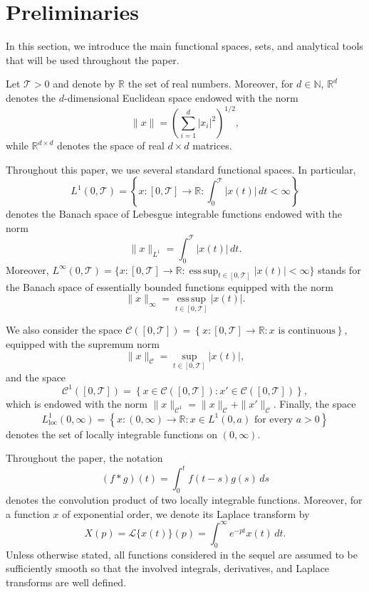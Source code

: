 \documentclass[11pt]{article}
\numberwithin{equation}{section}
\begin{document}
\section{Preliminaries}

In this section, we introduce the main functional spaces, sets, and analytical tools that will be used throughout the paper.

Let $\mathcal{\mathcal{T}} > 0$ and denote by $\mathbb{R}$ the set of real numbers. Moreover, for \(d\in\mathbb N\), \(\mathbb R^d\) denotes the \(d\)-dimensional Euclidean space endowed with the norm
\[
\|x\|
=
\left(
\sum_{i=1}^{d}|x_i|^2
\right)^{1/2},
\]
while \(\mathbb R^{d\times d}\) denotes the space of real \(d\times d\) matrices.


Throughout this paper, we use several standard functional spaces. In particular,
\[
L^{1}(0,\mathcal{\mathcal{T}})
=
\left\{
x:[0,\mathcal{\mathcal{T}}]\to\mathbb{R}:
\int_{0}^{\mathcal{\mathcal{T}}}|x(t)|\,dt<\infty
\right\}
\]
denotes the Banach space of Lebesgue integrable functions endowed with the norm
\[
\|x\|_{L^{1}}
=
\int_{0}^{\mathcal{\mathcal{T}}}|x(t)|\,dt.
\]
Moreover,
\(
L^{\infty}(0,\mathcal{\mathcal{T}})
=
\{
x:[0,\mathcal{\mathcal{T}}]\to\mathbb{R}:
\operatorname*{ess\,sup}_{t\in[0,\mathcal{\mathcal{T}}]}|x(t)|<\infty
\}
\)
stands for the Banach space of essentially bounded functions equipped with the norm
\[
\|x\|_{\infty}
=
\operatorname*{ess\,sup}_{t\in[0,\mathcal{\mathcal{T}}]}|x(t)|.
\]

We also consider the space
\(
\mathcal{C}([0,\mathcal{\mathcal{T}}])
=
\left\{
x:[0,\mathcal{\mathcal{T}}]\to\mathbb{R}:
x \text{ is continuous}
\right\},
\)
equipped with the supremum norm
\[
\|x\|_{\mathcal{C}}
=
\sup_{t\in[0,\mathcal{T}]}|x(t)|,
\]
and the space
\[
\mathcal{C}^{1}([0,\mathcal{T}])
=
\left\{
x\in \mathcal{C}([0,\mathcal{T}]):
x' \in \mathcal{C}([0,\mathcal{T}])
\right\},
\]
which is endowed with the norm
\(
\|x\|_{\mathcal{C}^{1}}
=
\|x\|_{\mathcal{C}}
+
\|x'\|_{\mathcal{C}}.
\)
Finally, the space
\[
L_{\mathrm{loc}}^{1}(0,\infty)
=
\left\{
x:(0,\infty)\to\mathbb{R}:
x\in L^{1}(0,a)
\text{ for every } a>0
\right\}
\]
denotes the set of locally integrable functions on \((0,\infty)\).

Throughout the paper, the notation
\[
(f*g)(t)
=
\int_{0}^{t}f(t-s)g(s)\,ds
\]
denotes the convolution product of two locally integrable functions.
Moreover, for a function $x$ of exponential order, we denote its Laplace transform by
\[
X(p)
=
\mathcal L\{x(t)\}(p)
=
\int_{0}^{\infty}e^{-pt}x(t)\,dt.
\]
Unless otherwise stated, all functions considered in the sequel are assumed to be sufficiently smooth so that the involved integrals, derivatives, and Laplace transforms are well defined.
\end{document}
